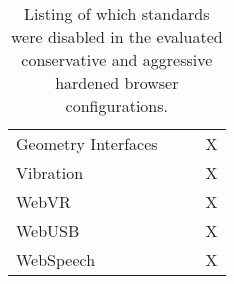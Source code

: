\begin{table}[th]
{\begin{tabular}{ l | c c c }
          Geometry Interfaces                           &   &   & X \\
          Vibration                                     &   &   & X \\
          WebVR                                         &   &   & X \\
          WebUSB                                        &   &   & X \\
          WebSpeech                                     &   &   & X \\
        \bottomrule
      \end{tabular}
    }
    \caption{Listing of which standards were disabled in the evaluated conservative and aggressive hardened browser configurations.}
    \label{table:browser-configs}
  \end{table}
